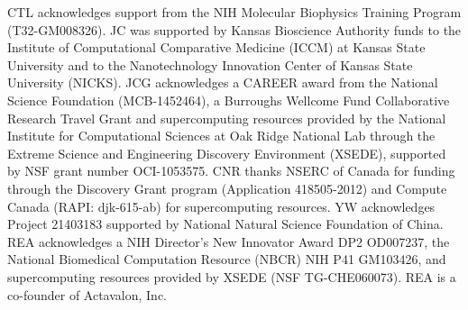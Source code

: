 \par CTL acknowledges support from the NIH Molecular Biophysics Training Program (T32-GM008326).  JC was supported by Kansas Bioscience Authority funds to the Institute of Computational Comparative Medicine (ICCM) at Kansas State University and to the Nanotechnology Innovation Center of Kansas State University (NICKS).  JCG acknowledges a CAREER award from the National Science Foundation (MCB-1452464), a Burroughs Wellcome Fund Collaborative Research Travel Grant and supercomputing resources provided by the National Institute for Computational Sciences at Oak Ridge National Lab through the Extreme Science and Engineering Discovery Environment (XSEDE), supported by NSF grant number OCI-1053575.  CNR thanks NSERC of Canada for funding through the Discovery Grant program (Application 418505-2012) and Compute Canada (RAPI: djk-615-ab) for supercomputing resources.  YW acknowledges Project 21403183 supported by National Natural Science Foundation of China.  REA acknowledges a NIH Director's New Innovator Award DP2 OD007237, the National Biomedical Computation Resource (NBCR) NIH P41 GM103426, and supercomputing resources provided by XSEDE (NSF TG-CHE060073).  REA is a co-founder of Actavalon, Inc.
